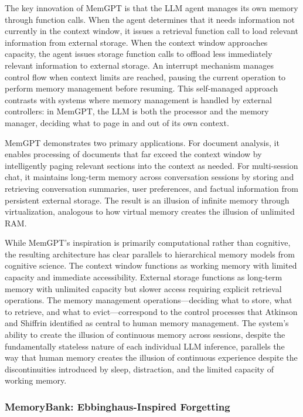 The key innovation of MemGPT is that the LLM agent manages its own memory through function calls. When the agent determines that it needs information not currently in the context window, it issues a retrieval function call to load relevant information from external storage. When the context window approaches capacity, the agent issues storage function calls to offload less immediately relevant information to external storage. An interrupt mechanism manages control flow when context limits are reached, pausing the current operation to perform memory management before resuming. This self-managed approach contrasts with systems where memory management is handled by external controllers: in MemGPT, the LLM is both the processor and the memory manager, deciding what to page in and out of its own context.

MemGPT demonstrates two primary applications. For document analysis, it enables processing of documents that far exceed the context window by intelligently paging relevant sections into the context as needed. For multi-session chat, it maintains long-term memory across conversation sessions by storing and retrieving conversation summaries, user preferences, and factual information from persistent external storage. The result is an illusion of infinite memory through virtualization, analogous to how virtual memory creates the illusion of unlimited RAM.

While MemGPT's inspiration is primarily computational rather than cognitive, the resulting architecture has clear parallels to hierarchical memory models from cognitive science. The context window functions as working memory with limited capacity and immediate accessibility. External storage functions as long-term memory with unlimited capacity but slower access requiring explicit retrieval operations. The memory management operations---deciding what to store, what to retrieve, and what to evict---correspond to the control processes that Atkinson and Shiffrin identified as central to human memory management. The system's ability to create the illusion of continuous memory across sessions, despite the fundamentally stateless nature of each individual LLM inference, parallels the way that human memory creates the illusion of continuous experience despite the discontinuities introduced by sleep, distraction, and the limited capacity of working memory.

\subsubsection{MemoryBank: Ebbinghaus-Inspired Forgetting}

